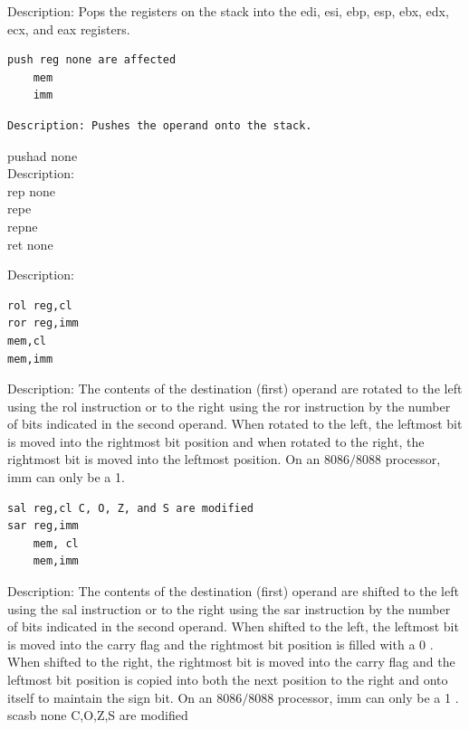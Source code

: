 \documentclass[10pt]{book}
\begin{document}
Description: Pops the registers on the stack into the edi, esi, ebp, esp, ebx, edx, ecx, and eax registers.

\begin{verbatim}
push reg none are affected
    mem
    imm
\end{verbatim}

\begin{verbatim}
Description: Pushes the operand onto the stack.
\end{verbatim}

pushad none\\
Description:\\
rep none\\
repe\\
repne\\
ret none

Description:

\begin{verbatim}
rol reg,cl
ror reg,imm
mem,cl
mem,imm
\end{verbatim}

Description: The contents of the destination (first) operand are rotated to the left using the rol instruction or to the right using the ror instruction by the number of bits indicated in the second operand. When rotated to the left, the leftmost bit is moved into the rightmost bit position and when rotated to the right, the rightmost bit is moved into the leftmost position. On an $8086 / 8088$ processor, imm can only be a 1.

\begin{verbatim}
sal reg,cl C, O, Z, and S are modified
sar reg,imm
    mem, cl
    mem,imm
\end{verbatim}

Description: The contents of the destination (first) operand are shifted to the left using the sal instruction or to the right using the sar instruction by the number of bits indicated in the second operand. When shifted to the left, the leftmost bit is moved into the carry flag and the rightmost bit position is filled with a 0 . When shifted to the right, the rightmost bit is moved into the carry flag and the leftmost bit position is copied into both the next position to the right and onto itself to maintain the sign bit. On an $8086 / 8088$ processor, imm can only be a 1 .\\
scasb none C,O,Z,S are modified
\end{document}
